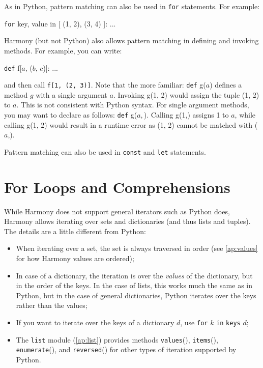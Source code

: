 \documentclass{report}
\newenvironment{code}{
\tcolorbox
}{
\endtcolorbox
}
\begin{document}
As in Python, pattern matching can also be used in \texttt{for} statements.
For example:
\begin{code}
\texttt{for} key, value in [ (1, 2), (3, 4) ]:
    ...
\end{code}

Harmony (but not Python)
also allows pattern matching in defining and invoking methods.
For example, you can write:
\begin{code}
\texttt{def} f[$a$, ($b$, $c$)]: ...
\end{code}
and then call \texttt{f[1, (2, 3)]}.
Note that the more familiar: \texttt{def} g($a$) defines a method $g$ with
a single argument $a$.  Invoking g(1, 2) would assign the tuple (1, 2) to
$a$.  This is not consistent with Python syntax.  For single argument methods,
you may want to declare as follows: \texttt{def} g($a,$).
Calling g(1,) assigns 1 to $a$, while calling g(1, 2) would result in a
runtime error as (1, 2) cannot be matched with ($a$,).

Pattern matching can also be used in \texttt{const} and \texttt{let}
statements.

\section{For Loops and Comprehensions}

While Harmony does not support general iterators such as Python does,
Harmony allows iterating over sets and dictionaries (and thus lists
and tuples).  The details are a little different from Python:

\begin{itemize}
\item When iterating over a set, the set is always traversed in order
(see \autoref{ap:values} for how Harmony values are ordered);
\item In case of a dictionary, the iteration is over the \emph{values} of the
dictionary, but in the order of the keys.  In the case of lists, this
works much the same as in Python, but in the case of general dictionaries,
Python iterates over the keys rather than the values;
\item If you want to iterate over the keys of a dictionary $d$, use
\texttt{for} $k$ \texttt{in} \texttt{keys} $d$;
\item The \texttt{list} module (\autoref{ap:list}) provides methods \texttt{values}(),
\texttt{items}(), \texttt{enumerate}(), and \texttt{reversed}() for
other types of iteration supported by Python.
\end{itemize}
\end{document}
